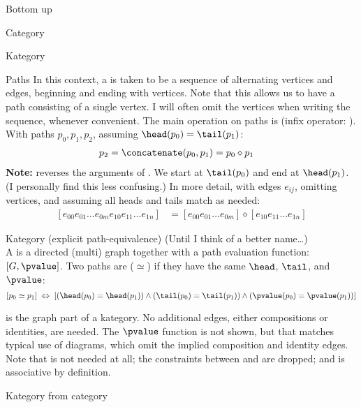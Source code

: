 \begin{plSection}{Bottom up}
\begin{plSection}{Category}
\begin{plSection}{Kategory}
\begin{plDefinition}{Paths}{}
In this context, a  is taken to be a sequence of
alternating vertices and edges, beginning and ending 
with vertices. 
Note that this allows us to have a path consisting 
of a single vertex.
I will often omit the vertices when writing the sequence,
whenever convenient.
The main operation on paths is \concatenate
(infix operator: \conop).
With paths $p_0,p_1,p_2$,
assuming $\head(p_0) = \tail(p_1)$: 
\begin{align*}
p_2 & = \concatenate(p_0,p_1) = p_0 \diamond p_1
\end{align*}
\textbf{Note:} \concatenate reverses the arguments
of \compose. 
We start at $\tail(p_0)$ and end at 
$\head(p_1)$.
(I personally find this less confusing.)
In more detail, with edges $e_{ij}$,
omitting vertices, 
and assuming all heads and tails match as needed:
\begin{align*}
\left[ e_{00} e_{01} \ldots e_{0m}
e_{10} e_{11} \ldots e_{1n}
 \right]
& = 
\left[ e_{00} e_{01} \ldots e_{0m} \right]
\diamond
\left[ e_{10} e_{11} \ldots e_{1n} \right]
\end{align*}
\end{plDefinition}

\begin{plDefinition}{Kategory (explicit path-equivalence)}{}
(Until I think of a better name\ldots)\\
A  is a directed (multi) graph together with
a path evaluation function: $\left[G, \pvalue\right]$.
Two paths are  ($\simeq$) 
if they have the same 
$\head$, $\tail$, and $\pvalue$:
\[
\left[ p_0 \simeq p_1 \right]
\;  \Leftrightarrow \;
\left[
\left( \head(p_0) = \head(p_1) \right)
\wedge
\left( \tail(p_0) = \tail(p_1) \right)
\wedge
\left( \pvalue(p_0) = \pvalue(p_1) \right)
\right]
\]
\end{plDefinition}

 is the graph part of a kategory.
No additional edges, either compositions or identities, are
needed. 
The $\pvalue$  function is not shown,
but that matches typical
use of diagrams, which omit the implied
composition and identity edges.
Note that \identity is not needed at all;
the constraints between \identity and \compose
are dropped; and \concatenate is associative by definition.
\end{plSection}

\begin{plSection}{Kategory from category}
\label{sec:Kategory_from_category}


\end{plSection}
\end{plSection}
\end{plSection}
